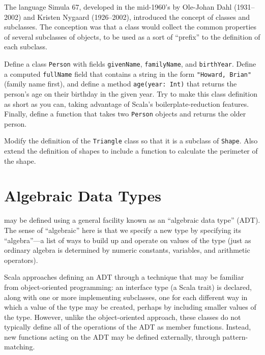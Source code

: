 \begin{tailquote}
The language Simula 67, developed in the mid-1960's by Ole-Johan Dahl (1931--2002) and Kristen Nygaard (1926--2002), introduced the concept of classes and subclasses. The conception was that a class would collect the common properties of several subclasses of objects, to be used as a sort of ``prefix'' to the definition of each subclass.\end{tailquote}
\begin{exercises}
\item Define a class \texttt{Person} with fields \texttt{givenName}, \texttt{familyName}, and \texttt{birthYear}. Define a computed \texttt{fullName} field that contains a string in the form \verb|"Howard, Brian"| (family name first), and define a method \verb|age(year: Int)| that returns the person's age on their birthday in the given year. Try to make this class definition as short as you can, taking advantage of Scala's boilerplate-reduction features. Finally, define a function that takes two \texttt{Person} objects and returns the older person.

\item Modify the definition of the \texttt{Triangle} class so that it is a subclass of \texttt{Shape}. Also extend the definition of shapes to include a function to calculate the perimeter of the shape.
\end{exercises}

\section{Algebraic Data Types}
 may be defined using a general facility known as an ``algebraic data type'' (ADT). The sense of ``algebraic'' here is that we specify a new type by specifying its ``algebra''---a list of ways to build up and operate on values of the type (just as ordinary algebra is determined by numeric constants, variables, and arithmetic operators).

Scala approaches defining an ADT through a technique that may be familiar from object-oriented programming: an interface type (a Scala trait) is declared, along with one or more implementing subclasses, one for each different way in which a value of the type may be created, perhaps by including smaller values of the type. However, unlike the object-oriented approach, these classes do not typically define all of the operations of the ADT as member functions. Instead, new functions acting on the ADT may be defined externally, through pattern-matching.

